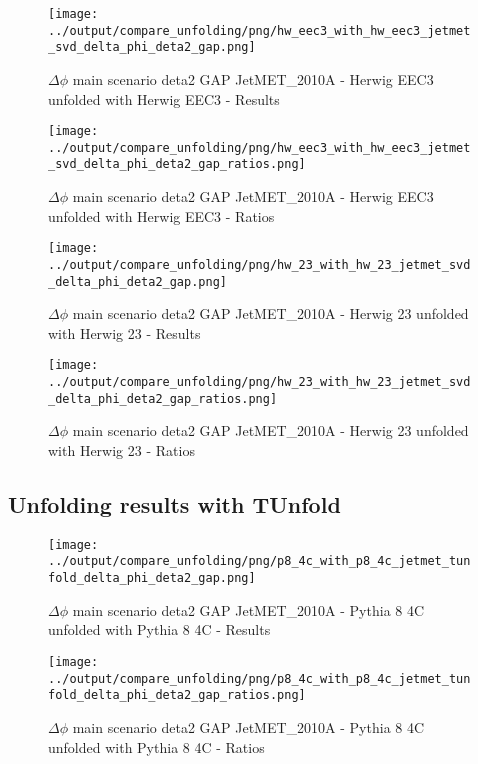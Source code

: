\documentclass[11pt]{book}
\begin{document}
\begin{figure}[ht]
\centering
\texttt{[image: ../output/compare\_unfolding/png/hw\_eec3\_with\_hw\_eec3\_jetmet\_svd\_delta\_phi\_deta2\_gap.png]}
\caption{$\Delta\phi$ main scenario deta2 GAP JetMET\_2010A - Herwig EEC3 unfolded with Herwig EEC3 - Results}
\label{hw_eec3_hw_eec3_jetmet_svd_delta_phi_deta2_gap_a}
\end{figure}

\begin{figure}[ht]
\centering
\texttt{[image: ../output/compare\_unfolding/png/hw\_eec3\_with\_hw\_eec3\_jetmet\_svd\_delta\_phi\_deta2\_gap\_ratios.png]}
\caption{$\Delta\phi$ main scenario deta2 GAP JetMET\_2010A - Herwig EEC3 unfolded with Herwig EEC3 - Ratios}
\label{hw_eec3_hw_eec3_jetmet_svd_delta_phi_deta2_gap_b}
\end{figure}

\begin{figure}[ht]
\centering
\texttt{[image: ../output/compare\_unfolding/png/hw\_23\_with\_hw\_23\_jetmet\_svd\_delta\_phi\_deta2\_gap.png]}
\caption{$\Delta\phi$ main scenario deta2 GAP JetMET\_2010A - Herwig 23 unfolded with Herwig 23 - Results}
\label{hw_23_hw_23_jetmet_svd_delta_phi_deta2_gap_a}
\end{figure}

\begin{figure}[ht]
\centering
\texttt{[image: ../output/compare\_unfolding/png/hw\_23\_with\_hw\_23\_jetmet\_svd\_delta\_phi\_deta2\_gap\_ratios.png]}
\caption{$\Delta\phi$ main scenario deta2 GAP JetMET\_2010A - Herwig 23 unfolded with Herwig 23 - Ratios}
\label{hw_23_hw_23_jetmet_svd_delta_phi_deta2_gap_b}
\end{figure}


\clearpage
\subsection{Unfolding results with TUnfold}

\begin{figure}[ht]
\centering
\texttt{[image: ../output/compare\_unfolding/png/p8\_4c\_with\_p8\_4c\_jetmet\_tunfold\_delta\_phi\_deta2\_gap.png]}
\caption{$\Delta\phi$ main scenario deta2 GAP JetMET\_2010A - Pythia 8 4C unfolded with Pythia 8 4C - Results}
\label{p8_p8_jetmet_tunfold_delta_phi_deta2_gap_a}
\end{figure}

\begin{figure}[ht]
\centering
\texttt{[image: ../output/compare\_unfolding/png/p8\_4c\_with\_p8\_4c\_jetmet\_tunfold\_delta\_phi\_deta2\_gap\_ratios.png]}
\caption{$\Delta\phi$ main scenario deta2 GAP JetMET\_2010A - Pythia 8 4C unfolded with Pythia 8 4C - Ratios}
\label{p8_p8_jetmet_tunfold_delta_phi_deta2_gap_b}
\end{figure}
\end{document}
